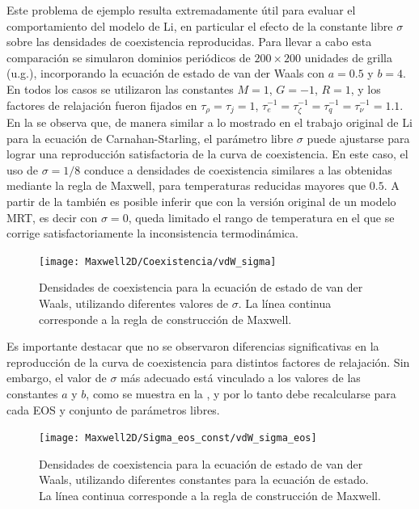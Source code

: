 Este problema de ejemplo resulta extremadamente \'util para evaluar el comportamiento del modelo de Li, en particular el efecto de la constante libre $\sigma$ sobre las densidades de coexistencia reproducidas. Para llevar a cabo esta comparaci\'on se simularon dominios peri\'odicos de $200\times 200$ unidades de grilla (u.g.), incorporando la ecuaci\'on de estado de van der Waals con $a=0.5$ y $b=4$. En todos los casos se utilizaron las constantes $M=1$, $G=-1$, $R=1$, y los factores de relajaci\'on fueron fijados en $\tau_{\rho} = \tau_j=1$, $\tau_{e}^{-1}=\tau_{\zeta}^{-1}=\tau_{q}^{-1}=\tau_{\nu}^{-1}=1.1$. En la  se observa que, de manera similar a lo mostrado en el trabajo original de Li \cite{li_lattice_2013} para la ecuaci\'on de Carnahan-Starling, el par\'ametro libre $\sigma$ puede ajustarse para lograr una reproducci\'on satisfactoria de la curva de coexistencia. En este caso, el uso de $\sigma=1/8$ conduce a densidades de coexistencia similares a las obtenidas mediante la regla de Maxwell, para temperaturas reducidas mayores que $0.5$. A partir de la  tambi\'en es posible inferir que con la versi\'on original de un modelo \pp{} MRT, es decir con $\sigma=0$, queda limitado el rango de temperatura en el que se corrige satisfactoriamente la inconsistencia termodin\'amica.

\begin{figure}[ht]
	\centering
	\texttt{[image: Maxwell2D/Coexistencia/vdW\_sigma]}
	\caption{Densidades de coexistencia para la ecuaci\'on de estado de van der Waals, utilizando diferentes valores de $\sigma$. La l\'inea continua corresponde a la regla de construcci\'on de Maxwell.}
	\label{fig:maxwell_vdW}
\end{figure}

Es importante destacar que no se observaron diferencias significativas en la reproducci\'on de la curva de coexistencia para distintos factores de relajaci\'on. Sin embargo, el valor de $\sigma$ m\'as adecuado est\'a vinculado a los valores de las constantes $a$ y $b$, como se muestra en la , y por lo tanto debe recalcularse para cada EOS y conjunto de par\'ametros libres.

\begin{figure}[ht]
	\centering
	\texttt{[image: Maxwell2D/Sigma\_eos\_const/vdW\_sigma\_eos]}
	\caption{Densidades de coexistencia para la ecuaci\'on de estado de van der Waals, utilizando diferentes constantes para la ecuaci\'on de estado. La l\'inea continua corresponde a la regla de construcci\'on de Maxwell.}
	\label{fig:maxwell_vdW_eos}
\end{figure}


